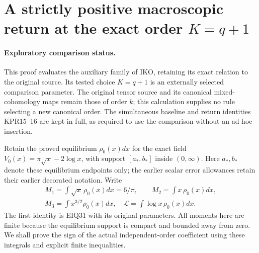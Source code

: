 \section{A strictly positive macroscopic return at the exact order $K=q+1$}
\label{sec:KPR}

\paragraph{Exploratory comparison status.}
This proof evaluates the auxiliary family of IKO, retaining its exact
relation to the original source. Its tested choice $K=q+1$ is an
externally selected comparison parameter. The original tensor source
and its canonical mixed-cohomology maps remain those of order $k$;
this calculation supplies no rule selecting a new canonical order.
The simultaneous baseline and return identities KPR15--16 are kept
in full, as required to use the comparison without an ad hoc insertion.

Retain the proved equilibrium $\rho_0(x)dx$ for the exact field
$V_0(x)=\pi\sqrt x-2\log x$, with support $[a_*,b_*]$ inside
$(0,\infty)$. Here $a_*,b_*$ denote these equilibrium endpoints
only; the earlier scalar error allowances retain their earlier
decorated notation. Write
\[
 \begin{gathered}
 M_1=\int\sqrt x\,\rho_0(x)dx=6/\pi,\qquad
 M_2=\int x\,\rho_0(x)dx,\\
 M_3=\int x^{3/2}\rho_0(x)dx,
 \quad\mathcal L=\int\log x\,\rho_0(x)dx.
 \end{gathered}
 \tag{KPR1}
\]
The first identity is EIQ31 with its original parameters. All moments
here are finite because the equilibrium support is compact and bounded
away from zero. We shall prove the sign of the actual independent-order
coefficient using these integrals and explicit finite inequalities.

